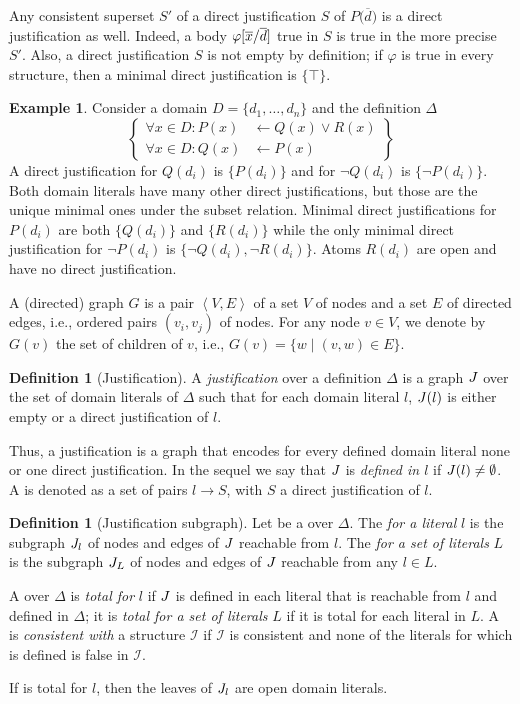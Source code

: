 \documentclass[11pt]{article}
\newcommand{\m}[1]{\ensuremath{#1}\xspace}
\newcommand{\lrule}{\m{\leftarrow}}
\newcommand{\true}{\m{\top}}
\newcommand{\I}{\m{\mathcal{I}}}
\newcommand{\D}{\m{\Delta}}
\newcommand{\f}{\m{\varphi}}
\newcommand{\xxx}{\m{\overline{x}}}
\newcommand{\ddd}{\m{\overline{d}}}
\newcommand{\bracketddd}{\m{\big(\overline{d}\big)}}
\newcommand{\tuple}[1]{\m{\left \langle #1 \right \rangle }}
\theoremstyle{plain}
\theoremstyle{definition}
\newtheorem{definition}[thm]{Definition}
\theoremstyle{example_basic}
\newtheorem{example}[thm]{Example}
\theoremstyle{example_contd}
\theoremstyle{plain}
\newcommand{\change}[1]{#1}
\begin{document}
Any consistent superset $S'$ of a direct justification $S$ of
$P\bracketddd$ is a direct justification as well. Indeed, a body $\f[\xxx\subs\ddd]$ true
in $S$ is true in the more precise $S'$. \change{Also, a direct justification
$S$ is not empty by definition; if $\f$ is true in every structure,
then a minimal direct justification is $\{\true\}$.}  

\newcommand{\ar}{\rightarrow}
\begin{example}\label{ex:justif1}
Consider a domain $D=\{d_1, \ldots, d_n\}$ and the definition \D
\[\left\{\begin{array}{ll}
\forall x\in D: P(x) &\lrule Q(x) \lor  R(x) \\
\forall x\in D: Q(x) &\lrule P(x)
\end{array}\right\}\]
A direct justification for $Q(d_i)$ is $\{P(d_i)\}$ and for $\neg Q(d_i)$ is $\{\neg P(d_i)\}$. Both domain literals have many other direct justifications, but those  are the unique minimal ones under the subset relation. Minimal direct justifications for $P(d_i)$ are both $\{Q(d_i)\}$ and $\{R(d_i)\}$ while the only minimal direct justification for $\lnot P(d_i)$ is $\{\lnot Q(d_i),\lnot R(d_i)\}$. Atoms $R(d_i)$ are open and have no direct justification.
\end{example}

\change{A (directed) graph $G$ is a pair $\tuple{V,E}$ of a set $V$ of
  nodes and a set $E$ of directed edges, i.e., ordered pairs
  $(v_i,v_j)$ of nodes. For any node $v\in V$, we denote by $G(v)$ the
  set of children of $v$, i.e., $G(v) = \{ w \mid (v,w)\in E\}$.}

\begin{definition}[Justification]
\change{A \emph{justification} over a definition \D is a  graph $J$ over the set of domain literals of \D such that for each domain literal $l$,
$J(l)$ is either empty or a  direct justification of $l$.}
\end{definition} 
Thus, a justification is a graph that encodes for every defined domain
literal none or one direct justification. 
In the sequel we say that
$J$ is \emph{defined in $l$} if $J(l)\neq\emptyset$. 
A \justification is denoted as a set of pairs $l
\rightarrow S$, 
with $S$ a direct justification of $l$.

\begin{definition}[Justification subgraph]
Let \jgraph be a \justification over \D.  The \justification \emph{for a literal} $l$ is the subgraph $J_l$ of nodes and edges of $J$ reachable from $l$. The \justification \emph{for a set of literals} $L$ is the subgraph $J_L$ of nodes and edges of $J$ reachable from any $l\in L$.

A \justification \jgraph over \D is \emph{total for} $l$  if $J$  is defined in each literal that is reachable from $l$ and  defined in \D; it is \emph{total for a set of literals} $L$ if it is total for each literal in $L$. A \justification \jgraph is \emph{consistent with} a structure \I if \I is consistent and none of the literals for which \jgraph is defined is false in \I.
\end{definition}
\change{If \jgraph is total for $l$, then the leaves of $J_l$ are open domain literals.}
 
\end{document}
